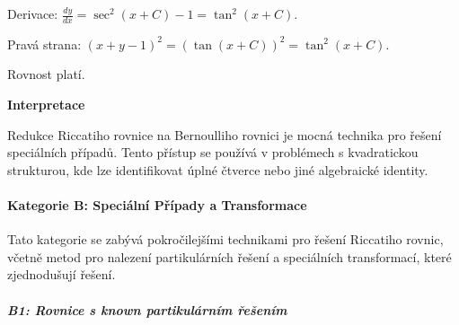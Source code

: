 \begin{example}
        Derivace: $\frac{dy}{dx} = \sec^2(x + C) - 1 = \tan^2(x + C)$.
        
        Pravá strana: $(x + y - 1)^2 = (\tan(x + C))^2 = \tan^2(x + C)$.
        
        Rovnost platí.
        
        \vspace{1.5\baselineskip}
        
        \noindent\textbf{Interpretace}
        
        Redukce Riccatiho rovnice na Bernoulliho rovnici je mocná technika pro řešení 
        speciálních případů. Tento přístup se používá v problémech s kvadratickou 
        strukturou, kde lze identifikovat úplné čtverce nebo jiné algebraické identity.
        
        \end{example}

        \vspace{2\baselineskip}

        \paragraph*{Kategorie B: Speciální Případy a Transformace}
\label{par:kategorie-b-specialni}

Tato kategorie se zabývá pokročilejšími technikami pro řešení Riccatiho rovnic, včetně metod pro nalezení partikulárních řešení a speciálních transformací, které zjednodušují řešení.

\vspace{0.8\baselineskip}

\subparagraph*{B1: Rovnice s known partikulárním řešením}
\label{subpar:b1-known-partikularni}

